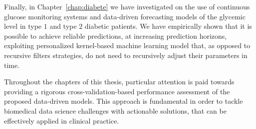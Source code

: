 Finally, in Chapter~\ref{chap:diabete} we have investigated on the use of continuous glucose monitoring systems and data-driven forecasting models of the glycemic level in type $1$ and type $2$ diabetic patients.
We have empirically shown that it is possible to achieve reliable predictions, at increasing prediction horizons, exploiting personalized kernel-based machine learning model that, as opposed to recursive filters strategies, do not need to recursively adjust their parameters in time.

Throughout the chapters of this thesis, particular attention is paid towards providing a rigorous cross-validation-based performance assessment of the proposed data-driven models. This approach is fundamental in order to tackle biomedical data science challenges with actionable solutions, that can be effectively applied in clinical practice.
